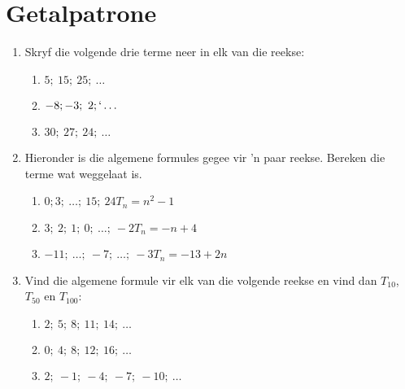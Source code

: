          \chapter{Getalpatrone}
\begin{exercises}{}
{ 
\begin{enumerate}[noitemsep, label=\textbf{\arabic*}. ] 
\item Skryf die volgende drie terme neer in elk van die reekse:
  \begin{enumerate} [noitemsep, label=\textbf{(\alph*)} ]
  \item $5;~15;~25;~\ldots$
  \item $-8;-3;~2;`\ldots$
  \item $30;~27;~24;~\ldots$
  \end{enumerate}
 \item Hieronder is die algemene formules gegee vir ’n paar reekse. Bereken die terme wat weggelaat is.
  \begin{enumerate} [noitemsep, label=\textbf{(\alph*)} ]
  \item $0;3;~\ldots;~15;~24$\hspace{2.2cm}$T_{n}={n}^{2}-1$
  \item $3;~2;~1;~0;~\ldots;~-2$\hspace{2cm}$T_{n}=-n+4$
  \item $-11;~\ldots;~-7;~\ldots;~-3$\hspace{1.5cm}$T_{n}=-13+2n$
  \end{enumerate}
\item Vind die algemene formule vir elk van die volgende reekse en vind dan ${T}_{10}$, ${T}_{50}$ en ${T}_{100}$:
  \begin{enumerate}[noitemsep, label=\textbf{(\alph*)} ]
  \item $2;~5;~8;~11;~14;~\ldots$
  \item $0;~4;~8;~12;~16;~\ldots$
  \item $2;~-1;~-4;~-7;~-10;~\ldots$
  \end{enumerate}
\end{enumerate}

}%
\end{exercises}


